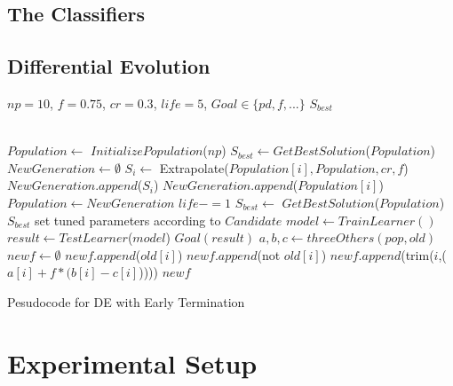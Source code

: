 \documentclass[12pt, journal, compsoc]{IEEEtran}
\begin{document}
\subsection{The Classifiers}
\subsection{Differential Evolution}
\begin{algorithm}[htbp!]
  
  \scriptsize
  \begin{algorithmic}[1]
    \Require $\mathit{np} = 10$, $f=0.75$, $cr=0.3$, $\mathit{life} = 5$, $\mathit{Goal} \in \{\mathit{pd},f,...\}$
    \Ensure $S_{best}$
    
    ~\\
    \State $Population  \gets $ $InitializePopulation$($\mathit{np}$)   
    \State $S_{best} \gets $$GetBestSolution$($Population $)
    \State $NewGeneration \gets \emptyset$
    \State $S_i \gets$ Extrapolate($Population [i], Population , cr, f$)
    \State $NewGeneration$.$append$($S_i$)
    \Else
    \State $NewGeneration$.$append$($Population [i]$)
    \EndIf
    \EndFor
    \State $Population  \gets NewGeneration$
    \State $life -=1$
    \EndIf
    \State $S_{best} \gets$ $GetBestSolution$($Population $)
    \EndWhile
    \State \Return $S_{best}$
    \EndFunction
    \State set tuned parameters according to $Candidate$
    \State $model \gets$$TrainLearner()$
    \State $result \gets$$TestLearner$($model$)   
    \State \Return$\mathit{Goal}(result)$  
    \EndFunction
    \State $a, b, c\gets threeOthers(pop,old)$  
    \State $newf \gets \emptyset$
    \State $newf$.$append$($old[i]$)
    \Else
    \State $newf$.$append$(not $old[i]$)
    \Else
    \State $newf$.$append$(trim($i$,($a[i] + f * (b[i] - c[i]$)))) 
    \EndIf
    \EndIf
    \EndFor
    \State \Return $newf$
    \EndFunction
  \end{algorithmic} 
  \caption{Pesudocode for DE with Early Termination}
  \label{alg:DE}
\end{algorithm}
\section{Experimental Setup}
\end{document}
